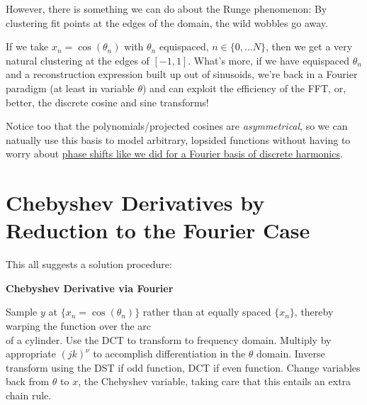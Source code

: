 \documentclass[10pt]{article}
\begin{document}
However, there is something we can do about the Runge phenomenon: By clustering fit points at the edges of the domain, the wild wobbles go away.

If we take $x_n = \cos(\theta_n)$ with $\theta_n$ equispaced, $n \in \{0, ...N\}$, then we get a very natural clustering at the edges of $[-1, 1]$. What's more, if we have equispaced $\theta_n$ and a reconstruction expression built up out of sinusoids, we're back in a Fourier paradigm (at least in variable $\theta$) and can exploit the efficiency of the FFT, or, better, the discrete cosine and sine transforms!\cite{dct}\cite{dst}

Notice too that the polynomials/projected cosines are \textit{asymmetrical}, so we can natually use this basis to model arbitrary, lopsided functions without having to worry about \hyperref[phase]{phase shifts like we did for a Fourier basis of discrete harmonics}.

\section{Chebyshev Derivatives by Reduction to the Fourier Case}\label{algo}

This all suggests a solution procedure:

\begin{algorithm}
\caption*{\textbf{Chebyshev Derivative via Fourier}}
\begin{algorithmic}[1] %
\STATE Sample $y$ at $\{x_n = \cos(\theta_n)\}$ rather than at equally spaced $\{x_n\}$, thereby warping the function over the arc\\of a cylinder.
\STATE Use the DCT to transform to frequency domain.
\STATE Multiply by appropriate $(jk)^\nu$ to accomplish differentiation in the $\theta$ domain.
\STATE Inverse transform using the DST if odd function, DCT if even function.
\STATE Change variables back from $\theta$ to $x$, the Chebyshev variable, taking care that this entails an extra chain rule.
\end{algorithmic}
\end{algorithm}
\end{document}
